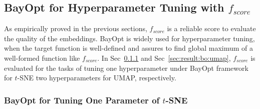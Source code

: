 \subsection{BayOpt for Hyperparameter Tuning with $f_{score}$}\label{sec:result:bo}
As empirically proved in the previous sections, $f_{score}$ is a reliable score to evaluate the quality of the embeddings.
BayOpt is widely used for hyperparameter tuning, when the target function is well-defined and assures to find global maximum of a well-formed function like $f_{score}$.
In Sec~\ref{sec:result:bo:tsne} and Sec~\ref{sec:result:bo:umap}, $f_{score}$ is evaluated for the tasks of tuning one hyperparameter under BayOpt framework for $t$-SNE two hyperparameters for UMAP, respectively.

\subsubsection{BayOpt for Tuning One Parameter of $t$-SNE}\label{sec:result:bo:tsne}

